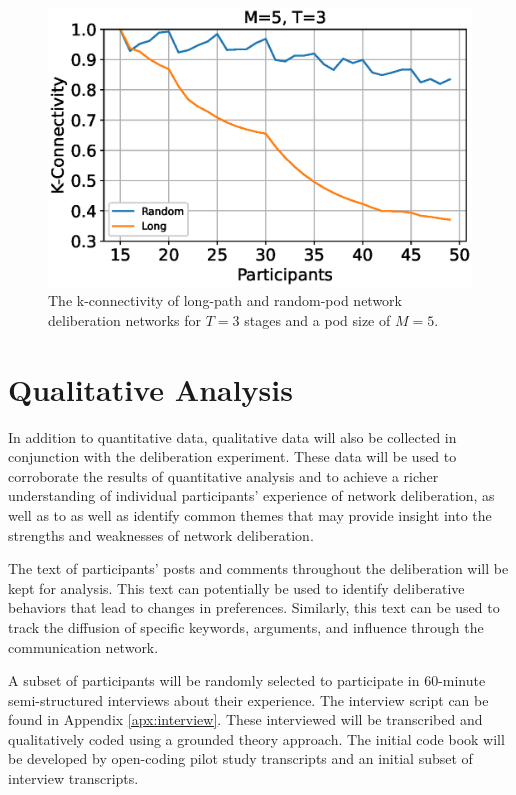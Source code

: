 \begin{figure}
\label{fig:kcon}
\includegraphics[width=5in]{chapters/figures/Experiment/fig-kcon.eps}
\caption{The k-connectivity of long-path and random-pod network deliberation
networks for $T=3$ stages and a pod size of $M=5$.}
\end{figure}

\section{Qualitative Analysis}
In addition to quantitative data,
qualitative data will also be collected in conjunction with
the deliberation experiment.
These data will be used to corroborate the results of quantitative
analysis and to achieve a richer understanding of individual participants'
experience of network deliberation,
as well as to as well as identify common themes that may provide
insight into the strengths and weaknesses of network deliberation.

The text of participants' posts and comments throughout the deliberation
will be kept for analysis.
This text can potentially be used to identify deliberative behaviors that
lead to changes in preferences.
Similarly, this text can be used to track the diffusion of specific keywords,
arguments, and influence through the communication network.

A subset of participants will be randomly selected to participate in
60-minute semi-structured interviews about their experience.
The interview script can be found in Appendix \ref{apx:interview}.
These interviewed will be transcribed and qualitatively coded using a
grounded theory approach.
The initial code book will be developed by open-coding pilot study transcripts
and an initial subset of interview transcripts.


